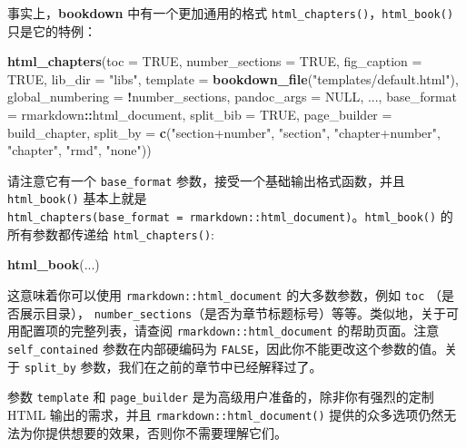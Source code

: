 \documentclass[
  12pt,
]{krantz}
\newenvironment{Shaded}{\begin{snugshade}}{\end{snugshade}}
\newcommand{\AttributeTok}[1]{\textcolor[rgb]{0.13,0.29,0.53}{#1}}
\newcommand{\ConstantTok}[1]{\textcolor[rgb]{0.56,0.35,0.01}{#1}}
\newcommand{\FunctionTok}[1]{\textcolor[rgb]{0.13,0.29,0.53}{\textbf{#1}}}
\newcommand{\NormalTok}[1]{#1}
\newcommand{\SpecialCharTok}[1]{\textcolor[rgb]{0.81,0.36,0.00}{\textbf{#1}}}
\newcommand{\StringTok}[1]{\textcolor[rgb]{0.31,0.60,0.02}{#1}}
\theoremstyle{definition}
\theoremstyle{definition}
\theoremstyle{definition}
\theoremstyle{definition}
\theoremstyle{remark}
\begin{document}
事实上，\textbf{bookdown} 中有一个更加通用的格式 \texttt{html\_chapters()}，\texttt{html\_book()} 只是它的特例：

\begin{Shaded}
\begin{Highlighting}[]
\FunctionTok{html\_chapters}\NormalTok{(}\AttributeTok{toc =} \ConstantTok{TRUE}\NormalTok{, }\AttributeTok{number\_sections =} \ConstantTok{TRUE}\NormalTok{,}
  \AttributeTok{fig\_caption =} \ConstantTok{TRUE}\NormalTok{, }\AttributeTok{lib\_dir =} \StringTok{"libs"}\NormalTok{,}
  \AttributeTok{template =} \FunctionTok{bookdown\_file}\NormalTok{(}\StringTok{"templates/default.html"}\NormalTok{),}
  \AttributeTok{global\_numbering =} \SpecialCharTok{!}\NormalTok{number\_sections,}
  \AttributeTok{pandoc\_args =} \ConstantTok{NULL}\NormalTok{, ...,}
  \AttributeTok{base\_format =}\NormalTok{ rmarkdown}\SpecialCharTok{::}\NormalTok{html\_document,}
  \AttributeTok{split\_bib =} \ConstantTok{TRUE}\NormalTok{, }\AttributeTok{page\_builder =}\NormalTok{ build\_chapter,}
  \AttributeTok{split\_by =} \FunctionTok{c}\NormalTok{(}\StringTok{"section+number"}\NormalTok{, }\StringTok{"section"}\NormalTok{, }\StringTok{"chapter+number"}\NormalTok{, }\StringTok{"chapter"}\NormalTok{, }\StringTok{"rmd"}\NormalTok{, }\StringTok{"none"}\NormalTok{))}
\end{Highlighting}
\end{Shaded}

请注意它有一个 \texttt{base\_format} 参数，接受一个基础输出格式函数，并且 \texttt{html\_book()} 基本上就是 \texttt{html\_chapters(base\_format\ =\ rmarkdown::html\_document)}。\texttt{html\_book()} 的所有参数都传递给 \texttt{html\_chapters()}:

\begin{Shaded}
\begin{Highlighting}[]
\FunctionTok{html\_book}\NormalTok{(...)}
\end{Highlighting}
\end{Shaded}

这意味着你可以使用 \texttt{rmarkdown::html\_document} 的大多数参数，例如 \texttt{toc} （是否展示目录）， \texttt{number\_sections}（是否为章节标题标号）等等。类似地，关于可用配置项的完整列表，请查阅 \texttt{rmarkdown::html\_document} 的帮助页面。注意 \texttt{self\_contained} 参数在内部硬编码为 \texttt{FALSE}，因此你不能更改这个参数的值。关于 \texttt{split\_by} 参数，我们在之前的章节中已经解释过了。

参数 \texttt{template} 和 \texttt{page\_builder} 是为高级用户准备的，除非你有强烈的定制 HTML 输出的需求，并且 \texttt{rmarkdown::html\_document()} 提供的众多选项仍然无法为你提供想要的效果，否则你不需要理解它们。
\end{document}
